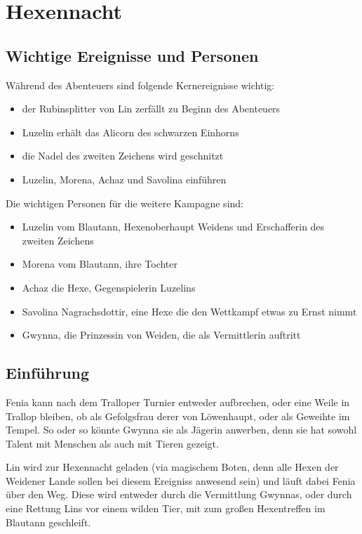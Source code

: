 \section{Hexennacht}

\subsection{Wichtige Ereignisse und Personen}

Während des Abenteuers sind folgende Kernereignisse wichtig:
\begin{itemize}
	\item der Rubinsplitter von Lin zerfällt zu Beginn des Abenteuers
	\item Luzelin erhält das Alicorn des schwarzen Einhorns
	\item die Nadel des zweiten Zeichens wird geschnitzt
	\item Luzelin, Morena, Achaz und Savolina einführen
\end{itemize}

Die wichtigen Personen für die weitere Kampagne sind:

\begin{itemize}
	\item Luzelin vom Blautann, Hexenoberhaupt Weidens und Erschafferin des zweiten Zeichens
	\item Morena vom Blautann, ihre Tochter
	\item Achaz die Hexe, Gegenspielerin Luzelins
	\item Savolina Nagrachsdottir, eine Hexe die den Wettkampf etwas zu Ernst nimmt
	\item Gwynna, die Prinzessin von Weiden, die als Vermittlerin auftritt
\end{itemize}

\subsection{Einführung}

Fenia kann nach dem Tralloper Turnier entweder aufbrechen, oder eine Weile in Trallop bleiben, ob als Gefolgsfrau derer von Löwenhaupt, oder als Geweihte im Tempel. So oder so könnte Gwynna sie als Jägerin anwerben, denn sie hat sowohl Talent mit Menschen als auch mit Tieren gezeigt.

Lin wird zur Hexennacht geladen (via magischem Boten, denn alle Hexen der Weidener Lande sollen bei diesem Ereigniss anwesend sein) und läuft dabei Fenia über den Weg. Diese wird entweder durch die Vermittlung Gwynnas, oder durch eine Rettung Lins vor einem wilden Tier, mit zum großen Hexentreffen im Blautann geschleift.

